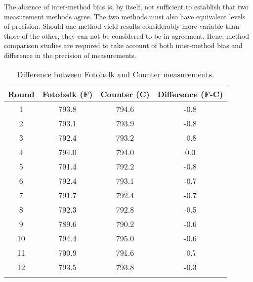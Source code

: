\documentclass[12pt, a4paper]{report}
\theoremstyle{plain}
\theoremstyle{definition}
\theoremstyle{remark}
\begin{document}
	The absence of inter-method bias is, by itself, not sufficient to
	establish that two measurement methods agree. The two methods
	must also have equivalent levels of precision. Should one method
	yield results considerably more variable than those of the other,
	they can not be considered to be in agreement. 
	Hene, method comparison studies are required to take account of both inter-method bias and difference in the precision of measurements.
	\begin{table}[h!]
		
		\begin{center}
			\phantom{MAKESPACE}
			\begin{tabular}{cccc}
				\hline
				Round & Fotobalk (F) & Counter (C) & Difference (F-C) \\
				\hline
				1 & 793.8& 794.6 & -0.8 \\
				2 & 793.1 & 793.9 & -0.8 \\
				3 & 792.4 & 793.2 & -0.8 \\
				4 & 794.0 & 794.0 & 0.0 \\
				5 & 791.4 & 792.2 & -0.8 \\
				6 & 792.4 & 793.1 & -0.7 \\
				7 & 791.7 & 792.4 & -0.7 \\
				8 & 792.3 & 792.8 & -0.5 \\
				9 & 789.6 & 790.2 & -0.6 \\
				10 & 794.4 & 795.0 & -0.6 \\
				11 & 790.9 & 791.6 & -0.7 \\
				12 & 793.5 & 793.8 & -0.3 \\
				\phantom{MAKESPACE} & \phantom{MAKESPACE} &\phantom{MAKESPACE} & \phantom{MAKESP}\\
			\end{tabular}
			\caption{Difference between Fotobalk and Counter measurements.}
		\end{center}
	\end{table}
	
	
	
	
	
	
	
	
\end{document}
